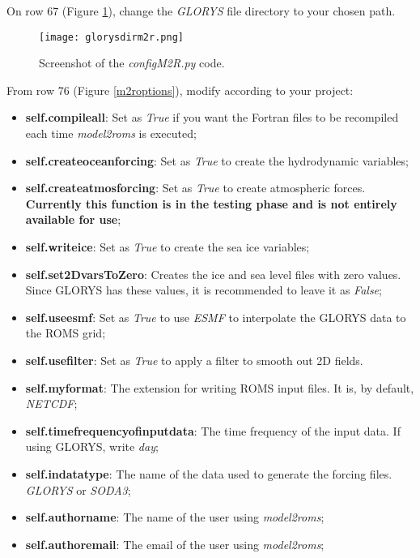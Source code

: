 \noindent On row 67 (Figure \textcolor{bleu_cite}{\ref{glorysdirm2r}}), change the \textit{GLORYS} file directory to your chosen path.
\bigskip

\begin{figure}[H]
    \centering
    \texttt{[image: glorysdirm2r.png]}
    \caption{Screenshot of the \textit{configM2R.py} code.}
    \label{glorysdirm2r}
\end{figure}
\bigskip

\noindent From row 76 (Figure \textcolor{bleu_cite}{\ref{m2roptions}}), modify according to your project: 
\bigskip

\begin{itemize}
    \item \textbf{self.compileall}: Set as \textit{True} if you want the Fortran files to be recompiled each time \textit{model2roms} is executed;
    \item \textbf{self.createoceanforcing}: Set as \textit{True} to create the hydrodynamic variables;
    \item \textbf{self.createatmosforcing}: Set as \textit{True} to create atmospheric forces. \textbf{Currently this function is in the testing phase and is not entirely available for use};
    \item \textbf{self.writeice}: Set as \textit{True} to create the sea ice variables;
    \item \textbf{self.set2DvarsToZero}: Creates the ice and sea level files with zero values. Since GLORYS has these values, it is recommended to leave it as \textit{False};
    \item \textbf{self.useesmf}: Set as \textit{True} to use \textit{ESMF} to interpolate the GLORYS data to the ROMS grid;
    \item \textbf{self.usefilter}: Set as \textit{True} to apply a filter to smooth out 2D fields.
    \item \textbf{self.myformat}: The extension for writing ROMS input files. It is, by default, \textit{NETCDF};
    \item \textbf{self.timefrequencyofinputdata}: The time frequency of the input data. If using GLORYS, write \textit{day};
    \item \textbf{self.indatatype}: The name of the data used to generate the forcing files. \textit{GLORYS} or \textit{SODA3};
    \item \textbf{self.authorname}: The name of the user using \textit{model2roms};
    \item \textbf{self.authoremail}: The email of the user using \textit{model2roms};

\end{itemize}
